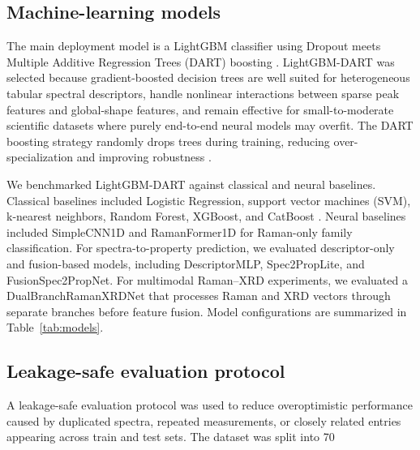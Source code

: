\subsection{Machine-learning models}
\label{subsec:ml_models}

The main deployment model is a LightGBM classifier using Dropout meets Multiple Additive Regression Trees (DART) boosting \cite{ke2017lightgbm,rashmi2015dart}. LightGBM-DART was selected because gradient-boosted decision trees are well suited for heterogeneous tabular spectral descriptors, handle nonlinear interactions between sparse peak features and global-shape features, and remain effective for small-to-moderate scientific datasets where purely end-to-end neural models may overfit. The DART boosting strategy randomly drops trees during training, reducing over-specialization and improving robustness \cite{rashmi2015dart}.

We benchmarked LightGBM-DART against classical and neural baselines. Classical baselines included Logistic Regression, support vector machines (SVM), k-nearest neighbors, Random Forest, XGBoost, and CatBoost \cite{cortes1995svm,chang2011libsvm,breiman2001randomforest,chen2016xgboost,dorogush2018catboost,pedregosa2011sklearn}. Neural baselines included SimpleCNN1D and RamanFormer1D for Raman-only family classification. For spectra-to-property prediction, we evaluated descriptor-only and fusion-based models, including DescriptorMLP, Spec2PropLite, and FusionSpec2PropNet. For multimodal Raman--XRD experiments, we evaluated a DualBranchRamanXRDNet that processes Raman and XRD vectors through separate branches before feature fusion. Model configurations are summarized in Table~\ref{tab:models}.



\subsection{Leakage-safe evaluation protocol}
\label{subsec:evaluation}

A leakage-safe evaluation protocol was used to reduce overoptimistic performance caused by duplicated spectra, repeated measurements, or closely related entries appearing across train and test sets. The dataset was split into 70%

